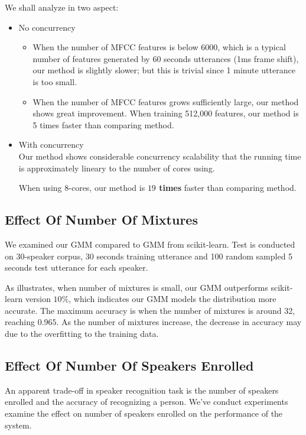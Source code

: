 We shall analyze in two aspect:
\begin{itemize}
	\item No concurrency \\
		\begin{itemize}
			\item When the number of MFCC features is below 6000, which is a typical
				number of features generated by 60 seconds utterances (1ms frame shift),
				our method is slightly slower; but this is trivial since
				1 minute utterance is too small.
			\item When the number of MFCC features grows sufficiently large, our method
				shows great improvement. When training 512,000 features, our method
				is 5 times faster than comparing method.
		\end{itemize}
	\item With concurrency \\
		Our method shows considerable concurrency scalability that the running time
		is approximately lineary to the number of cores using.

		When using 8-cores, our method is \textbf{$19$ times} faster than comparing
		method.
\end{itemize}


\subsection{Effect Of Number Of Mixtures}
We examined our GMM compared to GMM from scikit-learn.
Test is conducted on 30-speaker corpus, 30 seconds training utterance
and 100 random sampled 5 seconds test utterance for each speaker.

As  illustrates, when number of mixtures is small,
our GMM outperforms scikit-learn version $10\%$, which indicates our
GMM models the distribution more accurate. The maximum accuracy
is when the number of mixtures is around 32, reaching $0.965$. As
the number of mixtures increase, the decrease in accuracy
may due to the overfitting to the training data.

\subsection{Effect Of Number Of Speakers Enrolled}
An apparent trade-off in speaker recognition task is the number of speakers
enrolled and the accuracy of recognizing a person. We've conduct experiments
examine the effect on number of speakers enrolled on the performance of the
system.

